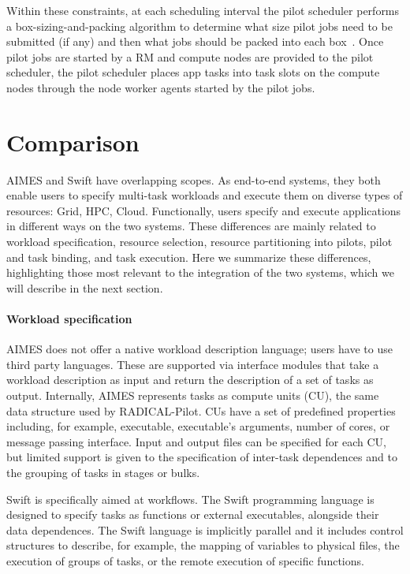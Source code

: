 \documentclass[10pt, conference, compsocconf]{IEEEtran}
\begin{document}
Within these constraints, at each scheduling interval the pilot scheduler
performs a box-sizing-and-packing algorithm to determine what size pilot jobs
need to be submitted (if any) and then what jobs should be packed into each
box~\cite{hategan2011coasters}. Once pilot jobs are started by a RM and
compute nodes are provided to the pilot scheduler, the pilot scheduler places
app tasks into task slots on the compute nodes through the node worker agents
started by the pilot jobs.


\section{Comparison}\label{sec:comparison}

AIMES and Swift have overlapping scopes. As end-to-end systems, they both enable
users to specify multi-task workloads and execute them on diverse types of
resources: Grid, HPC, Cloud. Functionally, users specify and execute
applications in different ways on the two systems. These differences are mainly
related to workload specification, resource selection, resource partitioning
into pilots, pilot and task binding, and task execution. Here we summarize these
differences, highlighting those most relevant to the integration of the two
systems, which we will describe in the next section.

\paragraph{Workload specification} AIMES does not offer a native workload
description language; users have to use third party languages. These are
supported via interface modules that take a workload description as input and
return the description of a set of tasks as output. Internally, AIMES represents
tasks as compute units (CU), the same data structure used by RADICAL-Pilot. CUs
have a set of predefined properties including, for example, executable,
executable's arguments, number of cores, or message passing interface. Input and
output files can be specified for each CU, but limited support is given to the
specification of inter-task dependences and to the grouping of tasks in stages
or bulks.

Swift is specifically aimed at workflows. The Swift programming language is
designed to specify tasks as functions or external executables, alongside their
data dependences. The Swift language is implicitly parallel and it includes
control structures to describe, for example, the mapping of variables to
physical files, the execution of groups of tasks, or the remote execution of
specific functions.
\end{document}
